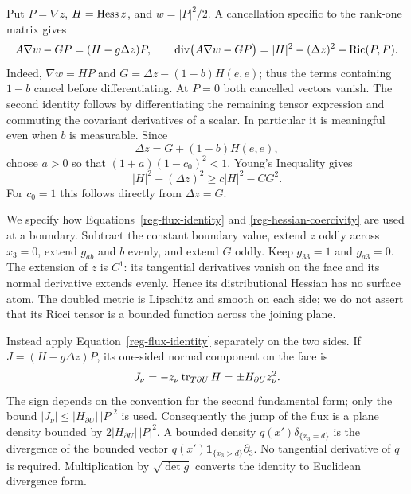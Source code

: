 Put $P=\nabla z$, $H=\operatorname{Hess} z$, and $w=|P|^2/2$. A cancellation
specific to the rank-one matrix gives
\begin{equation}
 A\nabla w-GP=(H-g\Delta z)P,
 \qquad
 \operatorname{div}\bigl(A\nabla w-GP\bigr)
   =|H|^2-(\Delta z)^2+\operatorname{Ric}(P,P).
 \label{reg-flux-identity}
\end{equation}
Indeed, $\nabla w=HP$ and
$G=\Delta z-(1-b)H(e,e)$; thus the terms containing $1-b$
cancel before differentiating. At $P=0$ both cancelled vectors vanish.
The second identity follows by differentiating the remaining tensor
expression and commuting the covariant derivatives of a scalar.
In particular it is meaningful even when $b$ is measurable.
Since
\[
 \Delta z=G+(1-b)H(e,e),
\]
choose $a>0$ so that $(1+a)(1-c_0)^2<1$. Young's Inequality gives
\begin{equation}
 |H|^2-(\Delta z)^2\ge c|H|^2-CG^2.
 \label{reg-hessian-coercivity}
\end{equation}
For $c_0=1$ this follows directly from $\Delta z=G$.

We specify how Equations~\eqref{reg-flux-identity} and
\eqref{reg-hessian-coercivity} are used at a boundary. Subtract the
constant boundary value, extend $z$ oddly across $x_3=0$, extend
$g_{ab}$ and $b$ evenly, and extend $G$ oddly. Keep $g_{33}=1$ and
$g_{a3}=0$. The extension of $z$ is $C^1$: its tangential derivatives
vanish on the face and its normal derivative extends evenly. Hence
its distributional Hessian has no surface atom. The doubled metric
is Lipschitz and smooth on each side; we do not assert that its Ricci
tensor is a bounded function across the joining plane.

Instead apply Equation~\eqref{reg-flux-identity} separately on the
two sides. If $J=(H-g\Delta z)P$, its one-sided normal component
on the face is
\begin{equation}
 J_\nu=-z_\nu\operatorname{tr}_{T\partial U}H
       =\pm H_{\partial U}z_\nu^2.
 \label{reg-boundary-flux}
\end{equation}
The sign depends on the convention for the second fundamental form;
only the bound $|J_\nu|\le |H_{\partial U}|\,|P|^2$ is used.
Consequently the jump of the flux is a plane density bounded by
$2|H_{\partial U}|\,|P|^2$. A bounded density
$q(x')\delta_{\{x_3=d\}}$ is the divergence of the bounded vector
$q(x')\mathbf 1_{\{x_3>d\}}\partial_3$. No tangential derivative
of $q$ is required. Multiplication by $\sqrt{\det g}$ converts the
identity to Euclidean divergence form.

